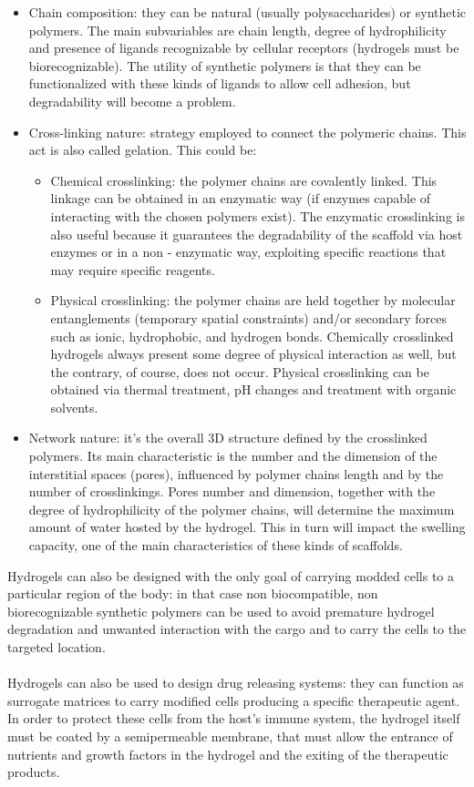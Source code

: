 \begin{itemize}
\item Chain composition: they can be natural (usually polysaccharides) or synthetic polymers. The main subvariables are chain length, degree of hydrophilicity and presence of ligands recognizable by cellular receptors (hydrogels must be biorecognizable). The utility of synthetic polymers is that they can be functionalized with these kinds of ligands to allow cell adhesion, but degradability will become a problem.
\item Cross-linking nature: strategy employed to connect the polymeric chains. This act is also called gelation. This could be:
	\begin{itemize}
	\item Chemical crosslinking: the polymer chains are covalently linked. 
This linkage can be obtained in an enzymatic way (if enzymes capable of interacting with the chosen polymers exist). 
The enzymatic crosslinking is also useful because it guarantees the degradability of the scaffold via host enzymes or in a non - enzymatic way, exploiting specific reactions that may require specific reagents.
	\item Physical crosslinking: the polymer chains are held together by molecular entanglements (temporary spatial constraints) and/or secondary forces such as ionic, hydrophobic, and hydrogen bonds. Chemically crosslinked hydrogels always present some degree of physical interaction as well, but the contrary, of course, does not occur. 
Physical crosslinking can be obtained via thermal treatment, pH changes and treatment with organic solvents.
	\end{itemize}
\item Network nature: it’s the overall 3D structure defined by the crosslinked polymers. 
Its main characteristic is the number and the dimension of the interstitial spaces (pores), influenced by polymer chains length and by the number of crosslinkings. 
Pores number and dimension, together with the degree of hydrophilicity of the polymer chains, will determine the maximum amount of water hosted by the hydrogel. 
This in turn will impact the swelling capacity, one of the main characteristics of these kinds of scaffolds.
\end{itemize}
\noindent
Hydrogels can also be designed with the only goal of carrying modded cells to a particular region of the body: in that case non biocompatible, non biorecognizable synthetic polymers can be used to avoid premature hydrogel degradation and unwanted interaction with the cargo and to carry the cells to the targeted location.
\\
\\
\noindent
Hydrogels can also be used to design drug releasing systems: they can function as surrogate matrices to carry modified cells producing a specific therapeutic agent. 
In order to protect these cells from the host’s immune system, the hydrogel itself must be coated by a semipermeable membrane, that must allow the entrance of nutrients and growth factors in the hydrogel and the exiting of the therapeutic products.
